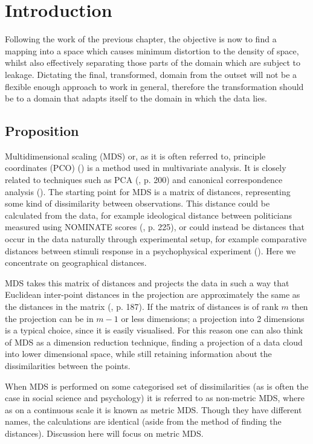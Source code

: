 
\label{chap-mds}

\section{Introduction}

Following the work of the previous chapter, the objective is now to find a mapping into a space which causes minimum distortion to the density of space, whilst also effectively separating those parts of the domain which are subject to leakage. Dictating the final, transformed, domain from the outset will not be a flexible enough approach to work in general, therefore the transformation should be to a domain that adapts itself to the domain in which the data lies.

\subsection{Proposition}

Multidimensional scaling (MDS) or, as it is often referred to, principle coordinates (PCO) (\cite{gower1966}) is a method used in multivariate analysis. It is closely related to techniques such as PCA (\cite{chatfieldcollins}, p. 200) and canonical correspondence analysis (\cite{terbraak}). The starting point for MDS is a matrix of distances, representing some kind of dissimilarity between observations. This distance could be calculated from the data, for example ideological distance between politicians measured using NOMINATE scores (\cite{quantss}, p. 225), or could instead be distances that occur in the data naturally through experimental setup,  for example comparative distances between stimuli response in a psychophysical experiment (\cite{torgerson}). Here we concentrate on geographical distances.

MDS takes this matrix of distances and projects the data in such a way that Euclidean inter-point distances in the projection are approximately the same as the distances in the matrix (\cite{chatfieldcollins}, p. 187). If the matrix of distances is of rank $m$ then the projection can be in $m-1$ or less dimensions; a projection into 2 dimensions is a typical choice, since it is easily visualised. For this reason one can also think of MDS as a dimension reduction technique, finding a projection of a data cloud into lower dimensional space, while still retaining information about the dissimilarities between the points.

When MDS is performed on some categorised set of dissimilarities (as is often the case in social science and psychology) it is referred to as non-metric MDS, where as on a continuous scale it is known as metric MDS. Though they have different names, the calculations are identical (aside from the method of finding the distances). Discussion here will focus on metric MDS.

